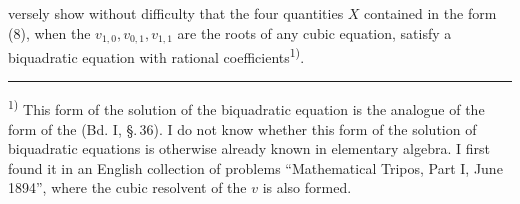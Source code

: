 versely show without difficulty that the four quantities
$X$ contained in the form (8), when the $v_{1,0}, v_{0,1}, v_{1,1}$ are the roots of any
cubic equation, satisfy a biquadratic equation with
rational coefficients\textsuperscript{1)}.

\noindent\rule{0.35\linewidth}{0.4pt}

\footnotesize
\noindent\textsuperscript{1)} This form of the solution of the biquadratic equation is the
analogue of the  form of the  (Bd. I,
\S.\,36). I do not know whether this form of the solution of biquadratic
equations is otherwise already known in elementary algebra. I
first found it in an English collection of problems ``Mathematical
Tripos, Part I, June 1894'', where the cubic resolvent
of the $v$ is also formed.
\normalsize
